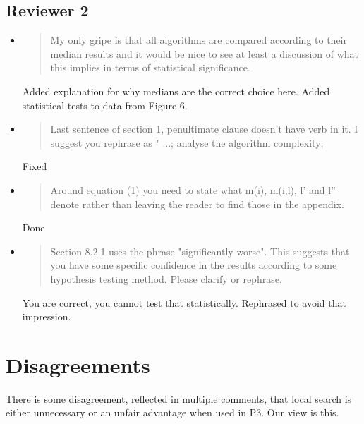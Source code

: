 \documentclass[]{article}
\begin{document}
\subsection{Reviewer 2}
\begin{itemize}

\item
\begin{quote}
My only gripe is that all algorithms are compared according to their median results and it would be nice to see at least a discussion of what this implies in terms of statistical significance.
\end{quote}

Added explanation for why medians are the correct choice here. Added statistical tests to data from Figure 6.

\item
\begin{quote}
Last sentence of section 1, penultimate clause doesn't have  verb in it. I suggest you rephrase as " ...; analyse the algorithm complexity; 
\end{quote}

Fixed

\item
\begin{quote}
Around equation (1) you need to state what m(i), m(i,l), l' and l'' denote rather than leaving the reader to find those in the appendix.
\end{quote}

Done

\item
\begin{quote}
Section 8.2.1 uses the phrase "significantly worse".  This suggests that you have some specific confidence in the results according to some hypothesis testing method.  Please clarify or rephrase.
\end{quote}

You are correct, you cannot test that statistically. Rephrased to avoid that impression.

\end{itemize}

\section{Disagreements}

There is some disagreement, reflected in multiple comments, that local search is either unnecessary or an unfair advantage when used in P3. Our view is this.
\end{document}
